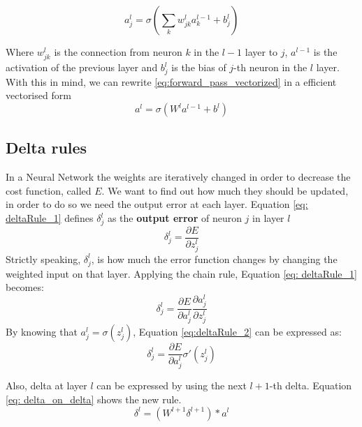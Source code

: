 \documentclass[11pt]{article}
\begin{document}
\begin{equation}
\label{eq:forward_pass}
a^l_j = \sigma(\sum_k w^l_{jk}a^{l-1}_k + b^l_j)
\end{equation}

Where $w^l_{jk}$ is the connection from neuron $k$ in the $l-1$ layer to $j$, $a^{l-1}$ is the activation of the previous layer and $b^l_j$ is the bias of $j$-th neuron in the $l$ layer. With this in mind, we can rewrite \ref{eq:forward_pass_vectorized} in a efficient vectorised form
\begin{equation}
a^l = \sigma(W^la^{l-1} + b^l)
\label{eq:forward_pass_vectorized}

\end{equation}

\subsection{Delta rules}
In a Neural Network the weights are iteratively changed in order to decrease the cost function, called $E$. We want to find out how much they should be updated, in order to do so we need the output error at each layer. Equation \ref{eq: deltaRule_1} defines $\delta^l_j$ as the \textbf{output error} of neuron $j$ in layer $l$
\begin{equation}
	\delta^l_j = \frac{\partial E}{\partial z^l_j}
	\label{eq: deltaRule_1}
\end{equation}
Strictly speaking, $\delta^l_j$, is how much the error function changes by changing the weighted input on that layer. Applying the chain rule, Equation \ref{eq: deltaRule_1} becomes:
\begin{equation}
\delta^l_j = \frac{\partial E}{\partial a^l_j} \frac{\partial a^l_j}{\partial z^l_j}
\label{eq:deltaRule_2}
\end{equation}
By knowing that $a^l_j = \sigma(z^l_j)$, Equation \ref{eq:deltaRule_2} can be expressed as:
\begin{equation}
\delta^l_j = \frac{\partial E}{\partial a^l_j} \sigma'(z^l_j)
\label{eq:deltaRule}	
\end{equation}

Also, delta at layer $l$ can be expressed by using the next $l+1$-th delta. Equation \ref{eq: delta_on_delta} shows the new rule.
\begin{equation}
\delta^l = (W^{l+1}\delta^{l+1}) * a^l
\label{eq: delta_on_delta}
\end{equation}
\end{document}
